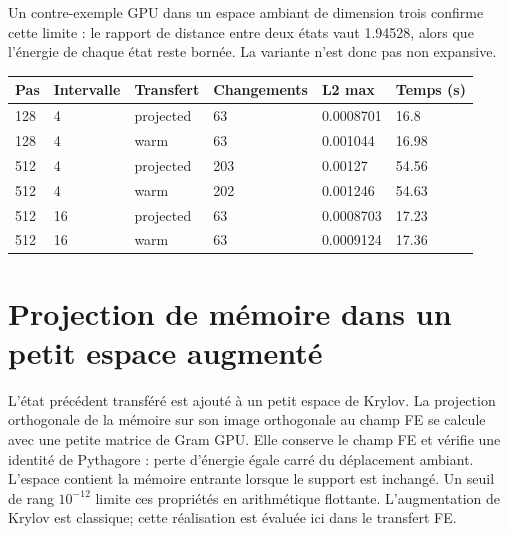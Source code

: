 \documentclass[10pt,a4paper]{article}
\begin{document}
Un contre-exemple GPU dans un espace ambiant de dimension trois confirme cette limite : le rapport de distance entre deux états vaut 1.94528, alors que l'énergie de chaque état reste bornée. La variante n'est donc pas non expansive.

\begin{center}\small\begin{tabular}{llllll}\toprule
Pas & Intervalle & Transfert & Changements & L2 max & Temps (s)\\\midrule
128 & 4 & projected & 63 & 0.0008701 & 16.8\\
128 & 4 & warm & 63 & 0.001044 & 16.98\\
512 & 4 & projected & 203 & 0.00127 & 54.56\\
512 & 4 & warm & 202 & 0.001246 & 54.63\\
512 & 16 & projected & 63 & 0.0008703 & 17.23\\
512 & 16 & warm & 63 & 0.0009124 & 17.36\\
\bottomrule\end{tabular}\end{center}
\section{Projection de mémoire dans un petit espace augmenté}
L'état précédent transféré est ajouté à un petit espace de Krylov. La projection orthogonale de la mémoire sur son image orthogonale au champ FE se calcule avec une petite matrice de Gram GPU. Elle conserve le champ FE et vérifie une identité de Pythagore : perte d'énergie égale carré du déplacement ambiant. L'espace contient la mémoire entrante lorsque le support est inchangé. Un seuil de rang \(10^{-12}\) limite ces propriétés en arithmétique flottante. L'augmentation de Krylov est classique; cette réalisation est évaluée ici dans le transfert FE.
\end{document}
